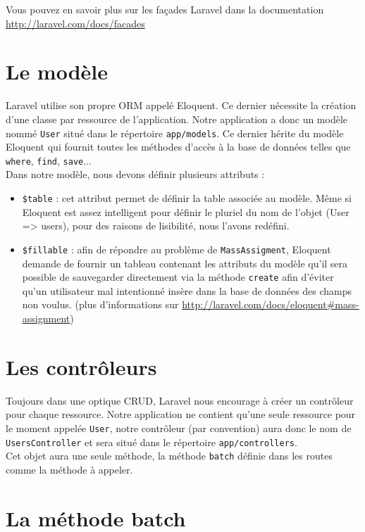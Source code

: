 Vous pouvez en savoir plus sur les façades Laravel dans la documentation \url{http://laravel.com/docs/facades}

\section{Le modèle}

Laravel utilise son propre ORM appelé Eloquent. Ce dernier nécessite la création d'une classe par ressource de l'application. Notre application a donc un modèle nommé \verb|User| situé dans le répertoire \verb|app/models|. Ce dernier hérite du modèle Eloquent qui fournit toutes les méthodes d'accès à la base de données telles que \verb|where|, \verb|find|, \verb|save|...\\

Dans notre modèle, nous devons définir plusieurs attributs :
\begin{itemize}
   \item \verb|$table| : cet attribut permet de définir la table associée au modèle. Même si Eloquent est assez intelligent pour définir le pluriel du nom de l'objet (User => users), pour des raisons de lisibilité, nous l'avons redéfini.
   \item \verb|$fillable| : afin de répondre au problème de \verb|MassAssigment|, Eloquent demande de fournir un tableau contenant les attributs du modèle qu'il sera possible de sauvegarder directement via la méthode \verb|create| afin d'éviter qu'un utilisateur mal intentionné insère dans la base de données des champs non voulus. (plus d'informations sur \url{http://laravel.com/docs/eloquent#mass-assignment})
\end{itemize}

\section{Les contrôleurs}

Toujours dans une optique CRUD, Laravel nous encourage à créer un contrôleur pour chaque ressource. Notre application ne contient qu'une seule ressource pour le moment appelée \verb|User|, notre contrôleur (par convention) aura donc le nom de \verb|UsersController| et sera situé dans le répertoire \verb|app/controllers|.\\

Cet objet aura une seule méthode, la méthode \verb|batch| définie dans les routes comme la méthode à appeler.

\section{La méthode batch}

